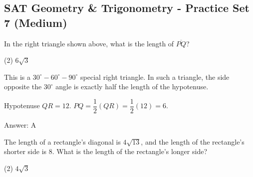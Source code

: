 \documentclass[11pt,paper=a4,answers]{exam}
\begin{document}
\begin{questions}
\pointsinrightmargin
\pointsdroppedatright
\marksnotpoints
{}
\pointformat{\boldmath\themarginpoints}
\bracketedpoints


\section*{SAT Geometry \& Trigonometry - Practice Set 7 (Medium)}

\question
\begin{center}
\end{center}
In the right triangle shown above, what is the length of $\overline{PQ}$?
\begin{tasks}(2)
    \task $6\sqrt{3}$
\end{tasks}

\begin{solution}
This is a $30^\circ-60^\circ-90^\circ$ special right triangle. In such a triangle, the side opposite the $30^\circ$ angle is exactly half the length of the hypotenuse.
\vspace{5pt}
\begin{center}
Hypotenuse $QR = 12$.
\vspace{5pt}
$PQ = \dfrac{1}{2}(QR) = \dfrac{1}{2}(12) = 6$.
\end{center}
\vspace{5pt}
Answer: \colorbox{yellow!100}{A}
\end{solution}

\vspace{1cm}

\question
The length of a rectangle's diagonal is $4\sqrt{13}$, and the length of the rectangle's shorter side is $8$. What is the length of the rectangle's longer side?
\begin{tasks}(2)
    \task $4\sqrt{3}$
\end{tasks}


\end{questions}
\end{document}
